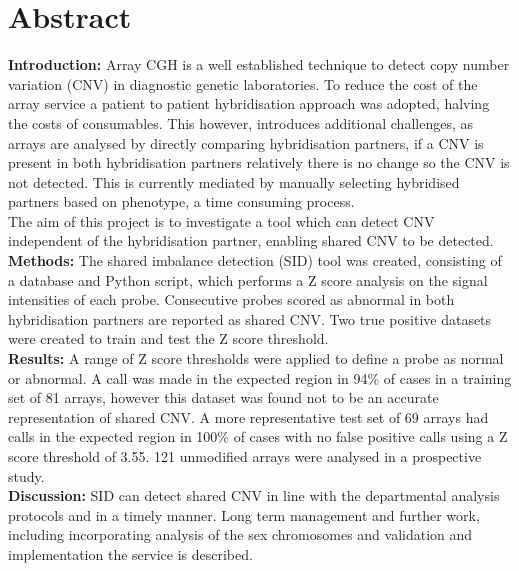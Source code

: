 \begingroup
\let\clearpage\relax
\let\cleardoublepage\relax
\let\cleardoublepage\relax
\chapter*{Abstract}
\textbf{Introduction:} Array CGH is a well established technique to detect copy number variation (CNV) in diagnostic genetic laboratories. To reduce the cost of the array service a patient to patient hybridisation approach was adopted, halving the costs of consumables. This however, introduces additional challenges, as arrays are analysed by directly comparing hybridisation partners, if a CNV is present in both hybridisation partners relatively there is no change so the CNV is not detected. This is currently mediated by manually selecting hybridised partners based on phenotype, a time consuming process.
\\ The aim of this project is to investigate a tool which can detect CNV independent of the hybridisation partner, enabling shared CNV to be detected.
\\ 
\textbf{Methods:} The shared imbalance detection (SID) tool was created, consisting of a database and Python script, which performs a Z score analysis on the signal intensities of each probe. Consecutive probes scored as abnormal in both hybridisation partners are reported as shared CNV. Two true positive datasets were created to train and test the Z score threshold. 
\\
\textbf{Results:} A range of Z score thresholds were applied to define a probe as normal or abnormal. A call was made in the expected region in 94\% of cases in a training set of 81 arrays, however this dataset was found not to be an accurate representation of shared CNV. A more representative test set of 69 arrays had calls in the expected region in 100\% of cases with no false positive calls using a Z score threshold of 3.55. 121 unmodified arrays were analysed in a prospective study.
\\
\textbf{Discussion:} SID can detect shared CNV in line with the departmental analysis protocols and in a timely manner. Long term management and further work, including incorporating analysis of the sex chromosomes and validation and implementation the service is described.
\endgroup			